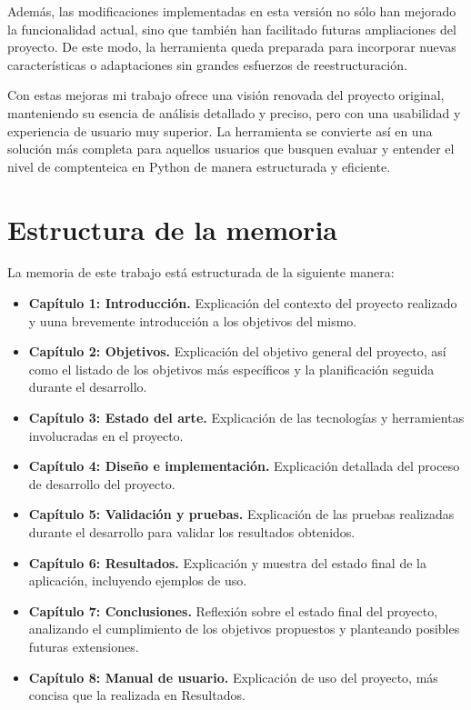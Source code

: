 \documentclass[a4paper, 12pt]{book}
\begin{document}
Además, las modificaciones implementadas en esta versión no sólo han mejorado la funcionalidad actual, sino que también han facilitado futuras ampliaciones del proyecto. De este modo, la herramienta queda preparada para incorporar nuevas características o adaptaciones sin grandes esfuerzos de reestructuración.

Con estas mejoras mi trabajo ofrece una visión renovada del proyecto original, manteniendo su esencia de análisis detallado y preciso, pero con una usabilidad y experiencia de usuario muy superior. La herramienta se convierte así en una solución más completa para aquellos usuarios que busquen evaluar y entender el nivel de comptenteica en Python de manera estructurada y eficiente.

\section{Estructura de la memoria}
\label{sec:estructura}


La memoria de este trabajo está estructurada de la siguiente manera:

\begin{itemize}
    \item \textbf{Capítulo 1: Introducción.} Explicación del contexto del proyecto realizado y uuna brevemente introducción a los objetivos del mismo.
    \item \textbf{Capítulo 2: Objetivos.} Explicación del objetivo general del proyecto, así como el listado de los objetivos más específicos y la planificación seguida durante el desarrollo.
    \item \textbf{Capítulo 3: Estado del arte.} Explicación de las tecnologías y herramientas involucradas en el proyecto.
    \item \textbf{Capítulo 4: Diseño e implementación.} Explicación detallada del proceso de desarrollo del proyecto.
    \item \textbf{Capítulo 5: Validación y pruebas.} Explicación de las pruebas realizadas durante el desarrollo para validar los resultados obtenidos.
    \item \textbf{Capítulo 6: Resultados.} Explicación y muestra del estado final de la aplicación, incluyendo ejemplos de uso.
    \item \textbf{Capítulo 7: Conclusiones.} Reflexión sobre el estado final del proyecto, analizando el cumplimiento de los objetivos propuestos y planteando posibles futuras extensiones.
    \item \textbf{Capítulo 8: Manual de usuario.} Explicación de uso del proyecto, más concisa que la realizada en Resultados.
    
\end{itemize}
\end{document}
